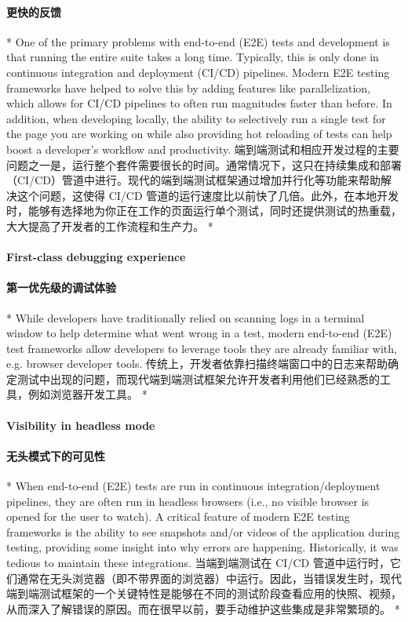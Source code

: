 \begin{paracol}{2}
\paragraph{更快的反馈}
\switchcolumn[0]*%
One of the primary problems with end-to-end (E2E) tests and development
is that running the entire suite takes a long time. Typically, this is
only done in continuous integration and deployment (CI/CD) pipelines.
Modern E2E testing frameworks have helped to solve this by adding
features like parallelization, which allows for CI/CD pipelines to often
run magnitudes faster than before. In addition, when developing locally,
the ability to selectively run a single test for the page you are
working on while also providing hot reloading of tests can help boost a
developer's workflow and productivity.
\switchcolumn
端到端测试和相应开发过程的主要问题之一是，运行整个套件需要很长的时间。通常情况下，这只在持续集成和部署（CI/CD）管道中进行。现代的端到端测试框架通过增加并行化等功能来帮助解决这个问题，这使得
CI/CD
管道的运行速度比以前快了几倍。此外，在本地开发时，能够有选择地为你正在工作的页面运行单个测试，同时还提供测试的热重载，大大提高了开发者的工作流程和生产力。
\switchcolumn[0]*%
\paragraph{First-class debugging experience}
\switchcolumn
\paragraph{第一优先级的调试体验}
\switchcolumn[0]*%
While developers have traditionally relied on scanning logs in a
terminal window to help determine what went wrong in a test, modern
end-to-end (E2E) test frameworks allow developers to leverage tools they
are already familiar with, e.g. browser developer tools.
\switchcolumn
传统上，开发者依靠扫描终端窗口中的日志来帮助确定测试中出现的问题，而现代端到端测试框架允许开发者利用他们已经熟悉的工具，例如浏览器开发工具。
\switchcolumn[0]*%
\paragraph{Visibility in headless mode}
\switchcolumn
\paragraph{无头模式下的可见性}
\switchcolumn[0]*%
When end-to-end (E2E) tests are run in continuous integration/deployment
pipelines, they are often run in headless browsers (i.e., no visible
browser is opened for the user to watch). A critical feature of modern
E2E testing frameworks is the ability to see snapshots and/or videos of
the application during testing, providing some insight into why errors
are happening. Historically, it was tedious to maintain these
integrations.
\switchcolumn
当端到端测试在 CI/CD
管道中运行时，它们通常在无头浏览器（即不带界面的浏览器）中运行。因此，当错误发生时，现代端到端测试框架的一个关键特性是能够在不同的测试阶段查看应用的快照、视频，从而深入了解错误的原因。而在很早以前，要手动维护这些集成是非常繁琐的。
\switchcolumn[0]*%

\end{paracol}
